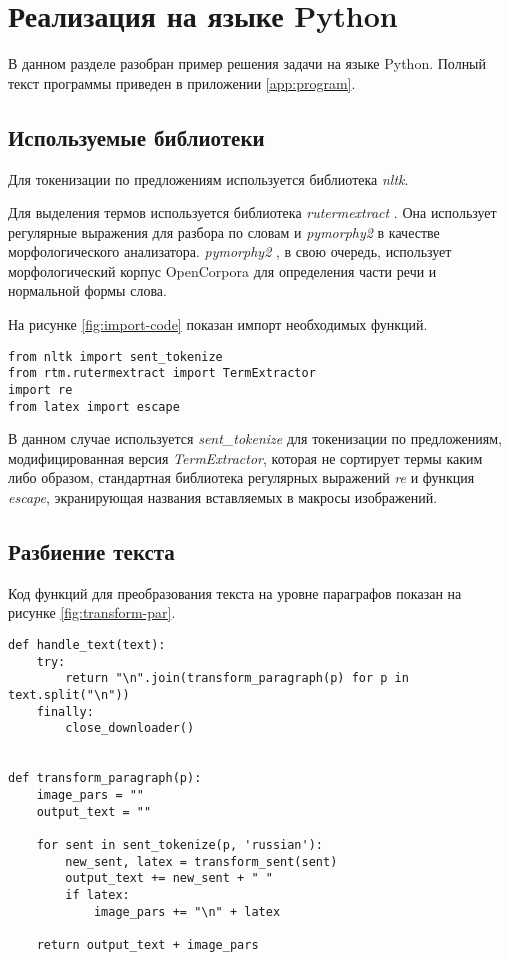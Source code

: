 \chapter{Реализация на языке Python}

В данном разделе разобран пример решения задачи на языке Python. Полный текст
программы приведен в приложении \ref{app:program}.

\section{Используемые библиотеки}
Для токенизации по предложениям используется библиотека \emph{nltk}.

Для выделения термов используется библиотека \emph{rutermextract}
\cite{rutermextract}. Она использует регулярные выражения для разбора по словам
и \emph{pymorphy2} в качестве морфологического анализатора. \emph{pymorphy2}
\cite{Korobov}, в свою очередь, использует морфологический корпус OpenCorpora
для определения части речи и нормальной формы слова.

На рисунке \ref{fig:import-code} показан импорт необходимых функций.

\begin{codewrap}[0.5]
\begin{verbatim}
from nltk import sent_tokenize
from rtm.rutermextract import TermExtractor
import re
from latex import escape
\end{verbatim}
\caption{}\label{fig:import-code}
\end{codewrap}

В данном случае используется \emph{sent_tokenize} для токенизации по
предложениям, модифицированная версия \emph{TermExtractor}, которая не
сортирует термы каким либо образом, стандартная библиотека регулярных выражений
\emph{re} и функция \emph{escape}, экранирующая названия вставляемых в макросы
изображений.

\section{Разбиение текста}

Код функций для преобразования текста на уровне параграфов показан на рисунке
\ref{fig:transform-par}.

\begin{codewrap}[1]
\begin{verbatim}
def handle_text(text):
    try:
        return "\n".join(transform_paragraph(p) for p in text.split("\n"))
    finally:
        close_downloader()


def transform_paragraph(p):
    image_pars = ""
    output_text = ""

    for sent in sent_tokenize(p, 'russian'):
        new_sent, latex = transform_sent(sent)
        output_text += new_sent + " "
        if latex:
            image_pars += "\n" + latex

    return output_text + image_pars
\end{verbatim}
\caption{}\label{fig:transform-par}
\end{codewrap}

